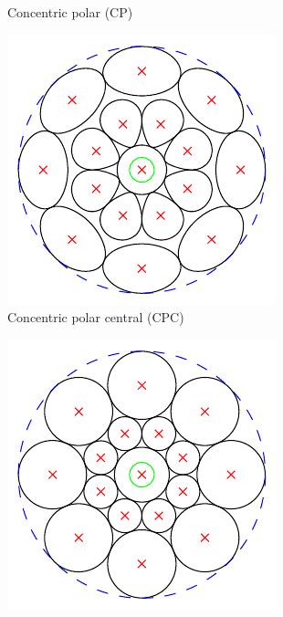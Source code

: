 \documentclass[thesis.tex]{subfiles}
\begin{document}
\begin{figure}[p]
\begin{subfigure}[t]{0.32\textwidth}
		\caption{Concentric polar (CP)}
		\label{fig:gridTypeCp}
	\end{subfigure}
	\begin{subfigure}[t]{0.32\textwidth}
		\includegraphics[width=\textwidth]{img/gridType_concentric_polar_central_polar_gaussian.pdf}
		\caption{Concentric polar central (CPC)}
		\label{fig:gridTypeCpc}
	\end{subfigure}
	\begin{subfigure}[t]{0.32\textwidth}
		\includegraphics[width=\textwidth]{img/gridType_concentric_log-polar.pdf}

\end{subfigure}
\end{figure}
\end{document}
